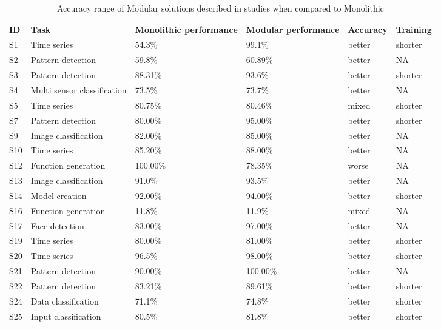 \documentclass{article}
\begin{document}
\begin{table*}[!htbp]
\centering
\caption{Accuracy range of Modular solutions described in studies when compared to Monolithic } \label{tab:accuracy}
\begin{tabularx}{\textwidth}{p{.2cm} p{5.1cm}  p{4cm} p{4cm} p{1.5cm} p{1cm} }
\hline

ID & Task & Monolithic  performance &  Modular performance& Accuracy& Training \\ \hline

S1 	&	 Time series 			&	 54.3\% 	&	 99.1\% 	&	 better 	&	 shorter 	\\
S2 	&	 Pattern detection 			&	 59.8\% 	&	 60.89\% 	&	 better 	&	 NA 	\\
S3 	&	 Pattern detection 			&	 88.31\% 	&	 93.6\% 	&	 better 	&	 shorter 	\\
S4 	&	 Multi sensor classification 			&	 73.5\% 	&	 73.7\% 	&	 better 	&	 NA 	\\
S5 	&	 Time series 			&	 80.75\% 	&	 80.46\% 	&	 mixed 	&	 shorter 	\\
S7 	&	 Pattern detection 			&	 80.00\% 	&	 95.00\% 	&	 better 	&	 shorter 	\\
S9 	&	 Image classification 			&	 82.00\% 	&	 85.00\% 	&	 better 	&	 NA 	\\
S10 	&	 Time series 			&	 85.20\% 	&	 88.00\% 	&	 better 	&	 NA 	\\
S12 	&	 Function generation 			&	 100.00\% 	&	 78.35\% 	&	 worse 	&	 NA 	\\
S13 	&	 Image classification 			&	 91.0\% 	&	 93.5\% 	&	 better 	&	 NA 	\\
S14 	&	 Model creation 			&	 92.00\% 	&	 94.00\% 	&	 better 	&	 shorter 	\\
S16 	&	 Function generation 			&	 11.8\% 	&	 11.9\% 	&	 mixed 	&	 NA 	\\
S17 	&	 Face detection 			&	 83.00\% 	&	 97.00\% 	&	 better 	&	 NA 	\\
S19 	&	 Time series 			&	 80.00\% 	&	 81.00\% 	&	 better 	&	 shorter 	\\
S20 	&	 Time series 			&	 96.5\% 	&	 98.00\% 	&	 better 	&	 shorter 	\\
S21 	&	 Pattern detection 			&	 90.00\% 	&	 100.00\% 	&	 better 	&	 NA 	\\
S22 	&	 Pattern detection 			&	 83.21\% 	&	 89.61\% 	&	 better 	&	 shorter 	\\
S24 	&	 Data classification 			&	 71.1\% 	&	 74.8\% 	&	 better 	&	 shorter 	\\
S25 	&	 Input classification 			&	 80.5\% 	&	 81.8\% 	&	 better 	&	 shorter 	\\

\end{tabularx}
\end{table*}
\end{document}
